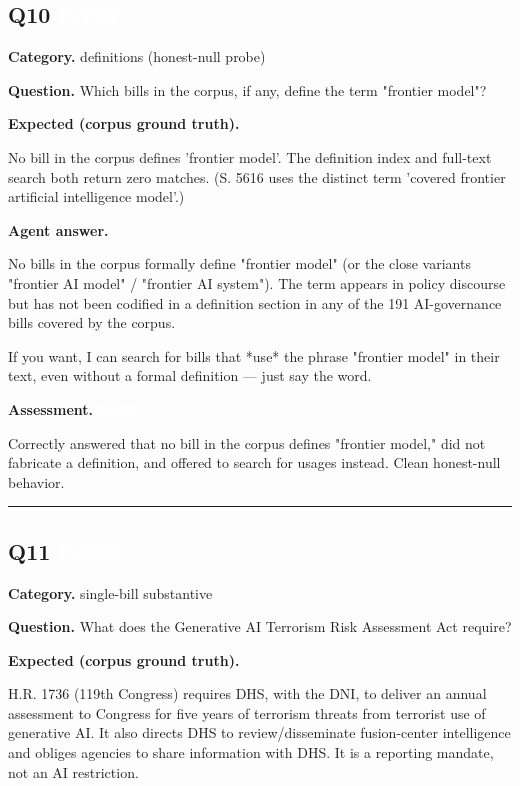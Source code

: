 \documentclass[11pt]{article}
\newcommand{\fieldlabel}[1]{\textbf{\color{navy}#1}\quad}
\begin{document}
\subsection*{Q10 \quad \colorbox{passgreen}{\textcolor{white}{\bfseries PASS}}}
\fieldlabel{Category.} definitions (honest-null probe)\par
\fieldlabel{Question.} Which bills in the corpus, if any, define the term "frontier model"?\par
\fieldlabel{Expected (corpus ground truth).}\par
No bill in the corpus defines 'frontier model'. The definition index and full-text search both return zero matches. (S. 5616 uses the distinct term 'covered frontier artificial intelligence model'.)

\fieldlabel{Agent answer.}\par
No bills in the corpus formally define "frontier model" (or the close variants "frontier AI model" / "frontier AI system"). The term appears in policy discourse but has not been codified in a definition section in any of the 191 AI-governance bills covered by the corpus.

If you want, I can search for bills that *use* the phrase "frontier model" in their text, even without a formal definition --- just say the word.

\fieldlabel{Assessment.} \colorbox{passgreen}{\textcolor{white}{\bfseries PASS}}\par
Correctly answered that no bill in the corpus defines "frontier model," did not fabricate a definition, and offered to search for usages instead. Clean honest-null behavior.
\vspace{4pt}\hrule\vspace{8pt}
\subsection*{Q11 \quad \colorbox{passgreen}{\textcolor{white}{\bfseries PASS}}}
\fieldlabel{Category.} single-bill substantive\par
\fieldlabel{Question.} What does the Generative AI Terrorism Risk Assessment Act require?\par
\fieldlabel{Expected (corpus ground truth).}\par
H.R. 1736 (119th Congress) requires DHS, with the DNI, to deliver an annual assessment to Congress for five years of terrorism threats from terrorist use of generative AI. It also directs DHS to review/disseminate fusion-center intelligence and obliges agencies to share information with DHS. It is a reporting mandate, not an AI restriction.
\end{document}
